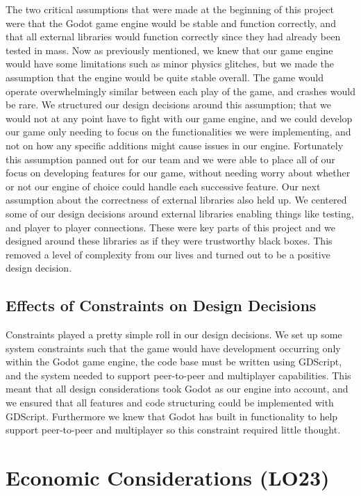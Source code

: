 \documentclass{article}
\begin{document}
The two critical assumptions that were made at the beginning of this project were that the Godot game engine would be stable and function correctly, and that all external libraries would function correctly since they had already been tested in mass. Now as previously mentioned, we knew that our game engine would have some limitations such as minor physics glitches, but we made the assumption that the engine would be quite stable overall. The game would operate overwhelmingly similar between each play of the game, and crashes would be rare. We structured our design decisions around this assumption; that we would not at any point have to fight with our game engine, and we could develop our game only needing to focus on the functionalities we were implementing, and not on how any specific additions might cause issues in our engine. Fortunately this assumption panned out for our team and we were able to place all of our focus on developing features for our game, without needing worry about whether or not our engine of choice could handle each successive feature. Our next assumption about the correctness of external libraries also held up. We centered some of our design decisions around external libraries enabling things like testing, and player to player connections. These were key parts of this project and we designed around these libraries as if they were trustworthy black boxes. This removed a level of complexity from our lives and turned out to be a positive design decision.

\subsection{Effects of Constraints on Design Decisions}

Constraints played a pretty simple roll in our design decisions. We set up some system constraints such that the game would have development occurring only within the Godot game engine, the code base must be written using GDScript, and the system needed to support peer-to-peer and multiplayer capabilities. This meant that all design considerations took Godot as our engine into account, and we ensured that all features and code structuring could be implemented with GDScript. Furthermore we knew that Godot has built in functionality to help support peer-to-peer and multiplayer so this constraint required little thought.
 

\section{Economic Considerations (LO23)}
\end{document}
